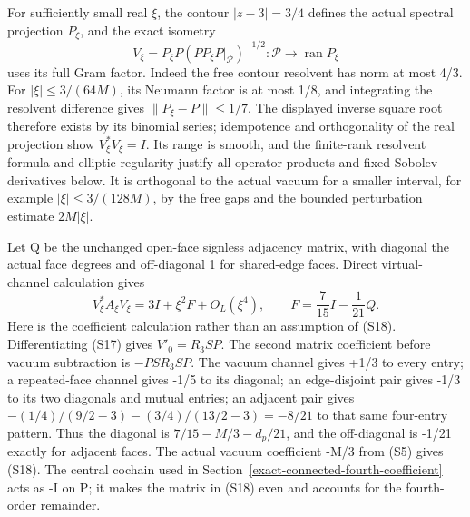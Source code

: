 For sufficiently small real \(\xi\), the contour \(|z-3|=3/4\) defines the actual spectral projection \(P_\xi\), and the exact isometry \[
 V_\xi=P_\xi P(PP_\xi P|_{\mathcal P})^{-1/2}
       :\mathcal P\longrightarrow\operatorname{ran}P_\xi
\tag{S17}
\] uses its full Gram factor. Indeed the free contour resolvent has norm at most 4/3. For \(|\xi|\le3/(64M)\), its Neumann factor is at most 1/8, and integrating the resolvent difference gives \(\|P_\xi-P\|\le1/7\). The displayed inverse square root therefore exists by its binomial series; idempotence and orthogonality of the real projection show \(V_\xi^*V_\xi=I\). Its range is smooth, and the finite-rank resolvent formula and elliptic regularity justify all operator products and fixed Sobolev derivatives below. It is orthogonal to the actual vacuum for a smaller interval, for example \(|\xi|\le3/(128M)\), by the free gaps and the bounded perturbation estimate \(2M|\xi|\).

Let Q be the unchanged open-face signless adjacency matrix, with diagonal the actual face degrees and off-diagonal 1 for shared-edge faces. Direct virtual-channel calculation gives \[
 V_\xi^*A_\xi V_\xi=3I+\xi^2F+O_L(\xi^4),\qquad
 F=\frac7{15}I-\frac1{21}Q.
\tag{S18}
\] Here is the coefficient calculation rather than an assumption of (S18). Differentiating (S17) gives \(V'_0=R_3SP\). The second matrix coefficient before vacuum subtraction is \(-PSR_3SP\). The vacuum channel gives +1/3 to every entry; a repeated-face channel gives -1/5 to its diagonal; an edge-disjoint pair gives -1/3 to its two diagonals and mutual entries; an adjacent pair gives \(- (1/4)/(9/2-3)-(3/4)/(13/2-3)=-8/21\) to that same four-entry pattern. Thus the diagonal is \(7/15-M/3-d_p/21\), and the off-diagonal is -1/21 exactly for adjacent faces. The actual vacuum coefficient -M/3 from (S5) gives (S18). The central cochain used in Section~\ref{exact-connected-fourth-coefficient} acts as -I on P; it makes the matrix in (S18) even and accounts for the fourth-order remainder.

